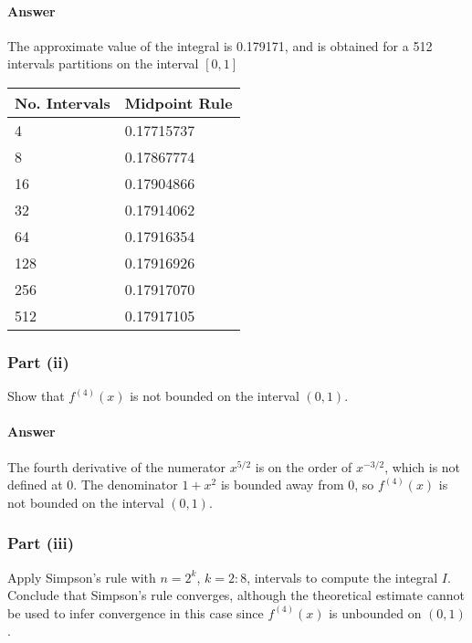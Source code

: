 \paragraph{Answer}
The approximate value of the integral is 0.179171, and is obtained for a 512
    intervals partitions on the interval $ [0, 1] $
\begin{table}
    \center
    \begin{tabular}[c]{l|l}
        \hline
        \multicolumn{1}{c|}{No. Intervals} &
        \multicolumn{1}{c}{Midpoint Rule} \\
        \hline
        4   & 0.17715737 \\
        8   & 0.17867774 \\
        16  & 0.17904866 \\
        32  & 0.17914062 \\
        64  & 0.17916354 \\
        128 & 0.17916926 \\
        256 & 0.17917070 \\
        512 & 0.17917105 \\
        \hline
    \end{tabular}
\end{table}

\subsubsection{Part (ii)}
Show that $ f^{(4)} (x) $ is not bounded on the interval $ (0, 1) $.

\paragraph{Answer}
The fourth derivative of the numerator $ x^{5/2} $ is on the order of
    $ x^{-3/2} $, which is not defined at 0.
The denominator $ 1 + x^2 $ is bounded away from 0, so $ f^{(4)}(x) $ is not
    bounded on the interval $ (0, 1) $.

\subsubsection{Part (iii)}
Apply Simpson's rule with $ n = 2^k $, $ k = 2 : 8 $, intervals to compute the
    integral $ I $.
Conclude that Simpson's rule converges, although the theoretical estimate
    cannot be used to infer convergence in this case since $ f^{(4)}(x) $ is
    unbounded on $ (0, 1) $.

